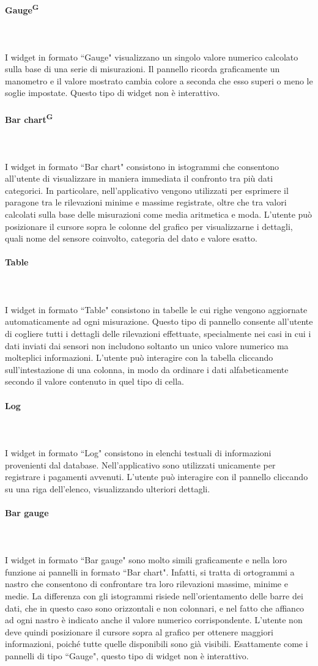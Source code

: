 \documentclass[8pt]{article}
\newcommand{\glossterm}[1]{#1\textsuperscript{G}} %
\newcommand{\subsubsubsection}[1]{\paragraph{#1}\mbox{}\\\\}
\begin{document}
\subsubsubsection{\glossterm{Gauge}}
I widget in formato ``Gauge" visualizzano un singolo valore numerico calcolato sulla base di una serie di misurazioni. Il pannello ricorda graficamente un manometro e il valore mostrato cambia colore a seconda che esso superi o meno le soglie impostate. Questo tipo di widget non è interattivo.

\subsubsubsection{\glossterm{Bar chart}}
I widget in formato ``Bar chart" consistono in istogrammi che consentono all'utente di visualizzare in maniera immediata il confronto tra più dati categorici. In particolare, nell'applicativo vengono utilizzati per esprimere il paragone tra le rilevazioni minime e massime registrate, oltre che tra valori calcolati sulla base delle misurazioni come media aritmetica e moda. L'utente può posizionare il cursore sopra le colonne del grafico per visualizzarne i dettagli, quali nome del sensore coinvolto, categoria del dato e valore esatto.

\subsubsubsection{Table}
I widget in formato ``Table" consistono in tabelle le cui righe vengono aggiornate automaticamente ad ogni misurazione. Questo tipo di pannello consente all'utente di cogliere tutti i dettagli delle rilevazioni effettuate, specialmente nei casi in cui i dati inviati dai sensori non includono soltanto un unico valore numerico ma molteplici informazioni. L'utente può interagire con la tabella cliccando sull'intestazione di una colonna, in modo da ordinare i dati alfabeticamente secondo il valore contenuto in quel tipo di cella.

\subsubsubsection{Log}
I widget in formato ``Log" consistono in elenchi testuali di informazioni provenienti dal database. Nell'applicativo sono utilizzati unicamente per registrare i pagamenti avvenuti. L'utente può interagire con il pannello cliccando su una riga dell'elenco, visualizzando ulteriori dettagli.

\subsubsubsection{Bar gauge}
I widget in formato ``Bar gauge" sono molto simili graficamente e nella loro funzione ai pannelli in formato ``Bar chart". Infatti, si tratta di ortogrammi a nastro che consentono di confrontare tra loro rilevazioni massime, minime e medie. La differenza con gli istogrammi risiede nell'orientamento delle barre dei dati, che in questo caso sono orizzontali e non colonnari, e nel fatto che affianco ad ogni nastro è indicato anche il valore numerico corrispondente. L'utente non deve quindi posizionare il cursore sopra al grafico per ottenere maggiori informazioni, poiché tutte quelle disponibili sono già visibili. Esattamente come i pannelli di tipo ``Gauge", questo tipo di widget non è interattivo.
\end{document}
